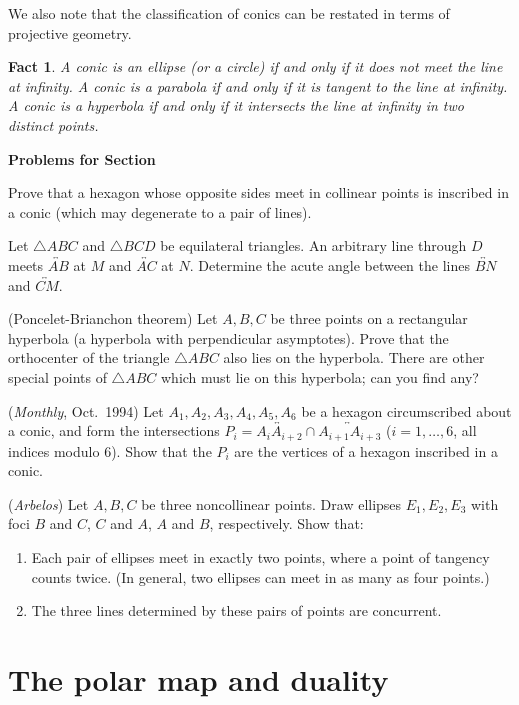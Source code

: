\documentclass[12pt]{book}
\newcounter{exc}
\numberwithin{exc}{section}
\numberwithin{figure}{section}
\newenvironment{exer}{\vspace{0.1in}
\noindent \textbf{Problems for Section~\thesection} \vspace{0.1in}
\begin{list}{\arabic{exc}.}{\usecounter{exc}}}{\end{list}}
\newtheorem{fact}[theorem]{Fact}
\numberwithin{equation}{theorem}
\def\ii{\item}
\def\line#1{\overleftrightarrow{#1}}
\begin{document}
We also note that the classification of conics can be restated in 
terms of projective geometry.
\begin{fact}
A conic is an ellipse (or a circle) if and only if it does not meet 
the line at infinity. A conic is a parabola if and only if it is 
tangent to the line at infinity. A conic is a hyperbola if and only if 
it intersects the line at infinity in two distinct points.
\end{fact}

\begin{exer}
\ii \label{ex:pascconv}
Prove that a hexagon whose opposite sides meet in collinear points is 
inscribed in a conic (which may degenerate to a pair of lines).
\ii
Let $\triangle ABC$ and $\triangle BCD$ be equilateral triangles. An arbitrary line
through $D$ meets $\line{AB}$ at $M$ and $\line{AC}$ at $N$. Determine the acute
angle between the lines $\line{BN}$ and $\line{CM}$.
\ii (Poncelet-Brianchon theorem) \label{ex:poncelet}
Let $A,B,C$ be three points on a rectangular hyperbola (a hyperbola 
with perpendicular asymptotes). Prove that the orthocenter of the 
triangle $\triangle ABC$ also lies on the hyperbola.
There are other 
special points of $\triangle ABC$ which must lie on this hyperbola; can you find 
any?
\ii (\textit{Monthly}, Oct.\ 1994)
Let $A_{1}, A_{2}, A_{3}, A_{4}, A_{5}, A_{6}$ be a hexagon 
circumscribed about a conic, and form the intersections $P_{i} = 
\line{A_{i}A_{i+2}} \cap \line{A_{i+1}A_{i+3}}$ 
($i = 1, \dots, 6$, all indices 
modulo 6). Show that the $P_{i}$ are the vertices of a hexagon 
inscribed in a conic.
\ii (\emph{Arbelos})
Let $A, B, C$ be three noncollinear points. Draw ellipses $E_{1}, 
E_{2}, E_{3}$ with foci $B$ and $C$, $C$ and $A$, $A$ and $B$, 
respectively. Show that:
\begin{enumerate}
\ii
Each pair of ellipses meet in exactly two points, where a point of 
tangency counts twice. (In general, two ellipses can meet in as many 
as four points.)
\ii
The three lines determined by these pairs of points are concurrent.
\end{enumerate}
\end{exer}

\section{The polar map and duality} \label{sec:polar}
\end{document}
